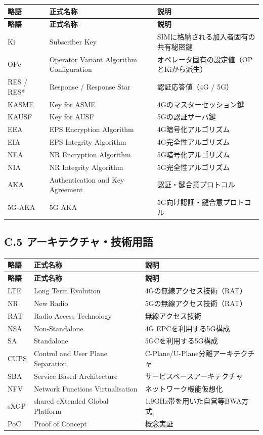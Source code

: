 \begin{longtable}{|p{1.8cm}|p{4.5cm}|p{6.5cm}|}
\hline
\textbf{略語} & \textbf{正式名称} & \textbf{説明} \\
\hline
\endfirsthead
\hline
\textbf{略語} & \textbf{正式名称} & \textbf{説明} \\
\hline
\endhead
\hline
\endfoot
Ki & Subscriber Key & SIMに格納される加入者固有の共有秘密鍵 \\
\hline
OPc & Operator Variant Algorithm Configuration & オペレータ固有の設定値（OPとKiから派生） \\
\hline
RES / RES* & Response / Response Star & 認証応答値（4G / 5G） \\
\hline
KASME & Key for ASME & 4Gのマスターセッション鍵 \\
\hline
KAUSF & Key for AUSF & 5Gの認証サーバ鍵 \\
\hline
EEA & EPS Encryption Algorithm & 4G暗号化アルゴリズム \\
\hline
EIA & EPS Integrity Algorithm & 4G完全性アルゴリズム \\
\hline
NEA & NR Encryption Algorithm & 5G暗号化アルゴリズム \\
\hline
NIA & NR Integrity Algorithm & 5G完全性アルゴリズム \\
\hline
AKA & Authentication and Key Agreement & 認証・鍵合意プロトコル \\
\hline
5G-AKA & 5G AKA & 5G向け認証・鍵合意プロトコル \\
\hline
\end{longtable}

\subsection*{C.5 アーキテクチャ・技術用語}

\begin{longtable}{|p{1.8cm}|p{4.5cm}|p{6.5cm}|}
\hline
\textbf{略語} & \textbf{正式名称} & \textbf{説明} \\
\hline
\endfirsthead
\hline
\textbf{略語} & \textbf{正式名称} & \textbf{説明} \\
\hline
\endhead
\hline
\endfoot
LTE & Long Term Evolution & 4Gの無線アクセス技術（RAT） \\
\hline
NR & New Radio & 5Gの無線アクセス技術（RAT） \\
\hline
RAT & Radio Access Technology & 無線アクセス技術 \\
\hline
NSA & Non-Standalone & 4G EPCを利用する5G構成 \\
\hline
SA & Standalone & 5GCを利用する5G構成 \\
\hline
CUPS & Control and User Plane Separation & C-Plane/U-Plane分離アーキテクチャ \\
\hline
SBA & Service Based Architecture & サービスベースアーキテクチャ \\
\hline
NFV & Network Functions Virtualisation & ネットワーク機能仮想化 \\
\hline
sXGP & shared eXtended Global Platform & 1.9GHz帯を用いた自営等BWA方式 \\
\hline
PoC & Proof of Concept & 概念実証 \\
\hline
\end{longtable}
